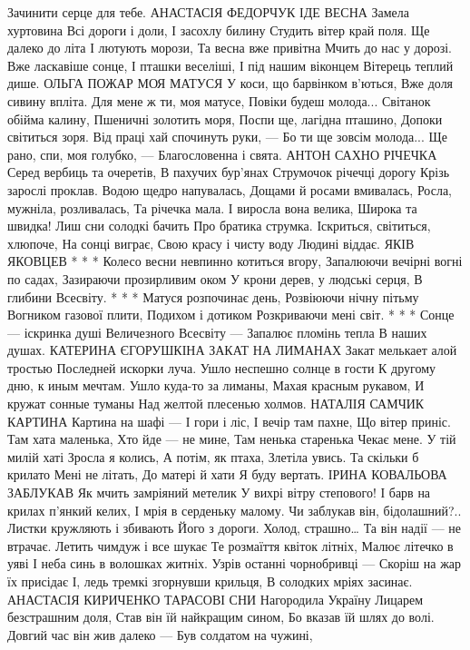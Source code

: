 Зачинити серце для тебе.
АНАСТАСІЯ ФЕДОРЧУК
ІДЕ ВЕСНА
Замела хуртовина
Всі дороги і доли,
І засохлу билину
Студить вітер край поля.
Ще далеко до літа
І лютують морози,
Та весна вже привітна
Мчить до нас у дорозі.
Вже ласкавіше сонце,
І пташки веселіші,
І під нашим віконцем
Вітерець теплий дише.
ОЛЬГА ПОЖАР
МОЯ МАТУСЯ 
У коси, що барвінком в’ються, 
Вже доля сивину впліта. 
Для мене ж ти, моя матусе, 
Повіки будеш молода... 
Світанок обійма калину, 
Пшеничні золотить моря, 
Поспи ще, лагідна пташино, 
Допоки світиться зоря. 
Від праці хай спочинуть руки, —   
Бо ти ще зовсім  молода... 
Ще рано, спи, моя голубко, —  
Благословенна і свята.
АНТОН САХНО
РІЧЕЧКА
Серед вербиць та очеретів,
В пахучих бур’янах
Струмочок річечці дорогу
Крізь зарослі проклав.
Водою щедро напувалась,
Дощами й росами вмивалась,
Росла, мужніла, розливалась,
Та річечка мала.
І виросла вона велика,
Широка та швидка!
Лиш сни солодкі бачить
Про братика струмка.
Іскриться, світиться, хлюпоче,
На сонці виграє,
Свою красу і чисту воду
Людині віддає.
ЯКІВ ЯКОВЦЕВ
* * *
Колесо весни невпинно котиться вгору,
Запалюючи вечірні вогні по садах,
Зазираючи прозирливим оком
У крони дерев, у людські серця,
В глибини Всесвіту.
* * *
Матуся розпочинає день,
Розвіюючи нічну пітьму
Вогником газової плити,
Подихом і дотиком
Розкриваючи мені світ.
* * *
Сонце — іскринка душі
Величезного Всесвіту —
Запалює пломінь тепла
В наших душах.
КАТЕРИНА ЄГОРУШКІНА
ЗАКАТ НА ЛИМАНАХ
Закат мелькает алой тростью
Последней искорки луча.
Ушло неспешно солнце в гости
К другому дню, к иным мечтам.
Ушло куда-то за лиманы,
Махая красным рукавом,
И кружат сонные туманы
Над желтой плесенью холмов.
НАТАЛІЯ САМЧИК
КАРТИНА
Картина на шафі —
І гори і ліс,
І вечір там пахне,
Що вітер приніс.
Там хата маленька,
Хто йде — не мине,
Там ненька старенька
Чекає мене.
У тій милій хаті
Зросла я колись,
А потім, як птаха,
Злетіла увись.
Та скільки б крилато
Мені не літать,
До матері й хати
Я буду вертать.
ІРИНА КОВАЛЬОВА 
ЗАБЛУКАВ
Як мчить замріяний метелик
У вихрі вітру степового!
І барв на крилах п’янкий келих,
І мрія в серденьку малому.
Чи заблукав він, бідолашний?.. 
Листки кружляють і збивають
Його з дороги. Холод, страшно…
Та він надії — не втрачає.
Летить чимдуж і все шукає
Те розмаїття квіток літніх,
Малює літечко в уяві
І неба синь в волошках  житніх.
Узрів останні чорнобривці —  
Скоріш на жар їх присідає
І, ледь тремкі згорнувши крильця,
В солодких мріях засинає.
АНАСТАСІЯ КИРИЧЕНКО
ТАРАСОВІ СНИ
Нагородила Україну
Лицарем безстрашним доля,
Став він їй найкращим сином,
Бо вказав їй шлях до  волі.
Довгий час він жив далеко —
Був солдатом на чужині,
